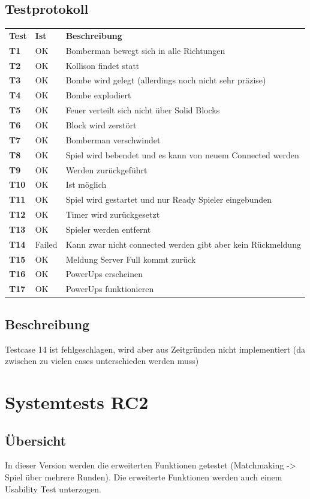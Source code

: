 \documentclass[11pt]{scrartcl}
\begin{document}
\subsection{Testprotokoll}
\begin{tabularx}{\linewidth}{l l X}
  \bf{Test} & \bf{Ist} & \bf{Beschreibung} \\
  \bf{T1} & OK & Bomberman bewegt sich in alle Richtungen\\
  \bf{T2} & OK &  Kollison findet statt\\
  \bf{T3} & OK  & Bombe wird gelegt (allerdings noch nicht sehr präzise)\\
  \bf{T4} & OK &  Bombe explodiert\\
  \bf{T5} & OK & Feuer verteilt sich nicht über Solid Blocks\\
  \bf{T6} & OK &  Block wird zerstört\\
  \bf{T7} & OK & Bomberman verschwindet\\
  \bf{T8} & OK & Spiel wird bebendet und es kann von neuem Connected werden\\
  \bf{T9} & OK & Werden zurückgeführt\\
  \bf{T10} & OK & Ist möglich\\
  \bf{T11} & OK& Spiel wird gestartet und nur Ready Spieler eingebunden\\
  \bf{T12} & OK &  Timer wird zurückgesetzt\\
  \bf{T13} & OK &  Spieler werden entfernt\\
  \bf{T14} & Failed & Kann zwar nicht connected werden gibt aber kein Rückmeldung \\
  \bf{T15} & OK & Meldung Server Full kommt zurück\\
  \bf{T16} & OK & PowerUps erscheinen\\
  \bf{T17} & OK & PowerUps funktionieren\\
\end{tabularx}
\subsection{Beschreibung}
Testcase 14 ist fehlgeschlagen, wird aber aus Zeitgründen nicht 
implementiert (da zwischen zu vielen cases unterschieden werden muss)
\section{Systemtests RC2}
\subsection{Übersicht}
In dieser Version werden die erweiterten Funktionen getestet (Matchmaking -> 
Spiel über mehrere Runden).
Die erweiterte Funktionen werden auch einem Usability Test unterzogen.
\end{document}
